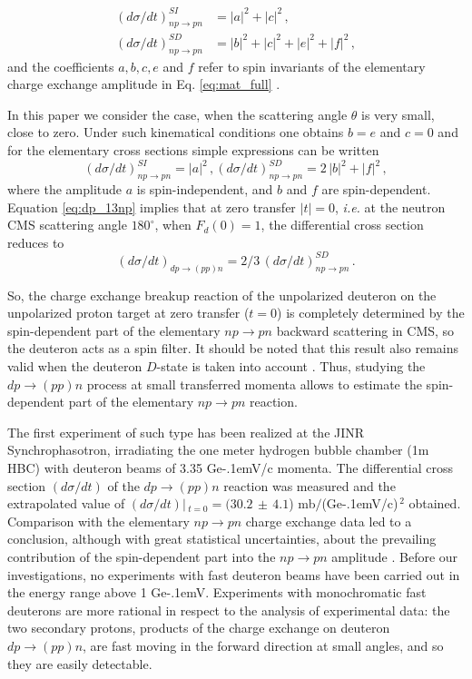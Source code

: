 \documentclass[twocolumn,epjc3]{svjour3}
\newcommand{\np}     {\ensuremath{np \rightarrow pn}\xspace}
\newcommand{\dpchex} {\ensuremath{dp \rightarrow (pp)n}\xspace}
\newcommand{\GeVc}   {Ge\kern-.1emV/c\xspace}
\newcommand{\GeV}    {Ge\kern-.1emV\xspace}
\begin{document}
\begin{equation}
  \begin{split}
    (d\sigma/dt)^{SI}_{\np} &= |a|^2 +|c|^2\,,\\
    (d\sigma/dt)^{SD}_{\np} &= |b|^2 + |c|^2 + |e|^2 + |f|^2\,,
  \end{split}
\end{equation}
and the coefficients $a, b, c, e$ and $f$ refer to spin invariants of the
elementary charge exchange amplitude in Eq. \eqref{eq:mat_full}
\cite{dea72,ala75_2}.

In this paper we consider the case, when the scattering angle $\theta$ is very
small, close to zero. Under such kinematical conditions one obtains $b = e$ and
$c = 0$ and for the elementary cross sections simple expressions can be written
\begin{equation}
  (d\sigma/dt)^{SI}_{\np} = |a|^2\,,
  (d\sigma/dt)^{SD}_{\np} = 2\,|b|^2 + |f|^2\,,
\end{equation}
where the amplitude $a$ is spin-independent, and $b$ and $f$ are spin-dependent.
Equation \eqref{eq:dp_13np} implies that at zero transfer $|t| = 0$,
\textit{i.e.} at the neutron CMS scattering angle $180^\circ$, when
$F_d(0) = 1$, the differential cross section reduces to
\begin{equation}
  \label{eq:dp_23np}
  (d\sigma/dt)_{\dpchex} = 2/3\,(d\sigma/dt)^{SD}_{\np}\,.
\end{equation}

So, the charge exchange breakup reaction of the unpolarized deuteron on the
unpolarized proton target at zero transfer ($t = 0$) is completely determined by
the spin-dependent part of the elementary \np backward scattering in CMS, so the
deuteron acts as a spin filter. It should be noted that this result also remains
valid when the deuteron $D$-state is taken into account \cite{led04}. Thus,
studying the \dpchex process at small transferred momenta allows to estimate the
spin-dependent part of the elementary \np reaction.

The first experiment of such type has been realized at the JINR
Synchrophasotron, irradiating the one meter hydrogen bubble chamber (1m HBC)
with deuteron beams of 3.35 \GeVc momenta. The differential cross section
$(d\sigma/dt)$ of the \dpchex reaction was measured and the extra\-polated value
of $(d\sigma/dt)|\,_{t=0}=(30.2\,\pm\,4.1$) mb$/$(\GeVc)$^{\,2}$ obtained.
Comparison with the elementary \np charge exchange data led to a conclusion,
although with great statistical uncertainties, about the prevailing contribution
of the spin-dependent part into the \np amplitude \cite{gla02,gla08}. Before our
investigations, no experiments with fast deuteron beams have been carried out in
the energy range above 1 \GeV. Experiments with monochromatic fast deuterons are
more rational in respect to the analysis of experimental data: the two secondary
protons, products of the charge exchange on deuteron \dpchex, are fast moving in
the forward direction at small angles, and so they are easily detectable.
\end{document}
